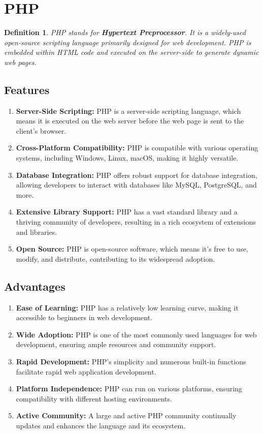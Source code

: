 \documentclass[11pt]{article}
\newtheorem{dfn}[thm]{Definition}
\begin{document}
\section{PHP}

\begin{dfn}
    PHP stands for \textbf{Hypertext Preprocessor}. It is a widely-used open-source scripting language primarily designed for web development. PHP is embedded within HTML code and executed on the server-side to generate dynamic web pages.
\end{dfn}

\subsection{Features}
\begin{enumerate}
    \item \textbf{Server-Side Scripting:} PHP is a server-side scripting language, which means it is executed on the web server before the web page is sent to the client's browser.
    \item \textbf{Cross-Platform Compatibility:} PHP is compatible with various operating systems, including Windows, Linux, macOS, making it highly versatile.
    \item \textbf{Database Integration:} PHP offers robust support for database integration, allowing developers to interact with databases like MySQL, PostgreSQL, and more.
    \item \textbf{Extensive Library Support:} PHP has a vast standard library and a thriving community of developers, resulting in a rich ecosystem of extensions and libraries.
    \item \textbf{Open Source:} PHP is open-source software, which means it's free to use, modify, and distribute, contributing to its widespread adoption.
\end{enumerate}

\subsection{Advantages}
\begin{enumerate}
    \item \textbf{Ease of Learning:} PHP has a relatively low learning curve, making it accessible to beginners in web development.
    \item \textbf{Wide Adoption:} PHP is one of the most commonly used languages for web development, ensuring ample resources and community support.
    \item \textbf{Rapid Development:} PHP's simplicity and numerous built-in functions facilitate rapid web application development.
    \item \textbf{Platform Independence:} PHP can run on various platforms, ensuring compatibility with different hosting environments.
    \item \textbf{Active Community:} A large and active PHP community continually updates and enhances the language and its ecosystem.
\end{enumerate}
\end{document}
